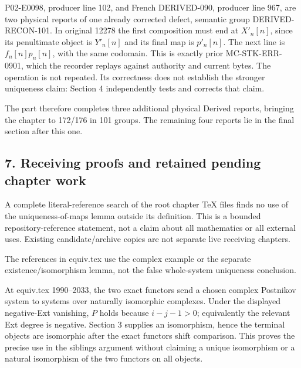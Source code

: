 \documentclass[11pt]{article}
\begin{document}
P02-E0098,\allowbreak{} producer line 102,\allowbreak{} and French DERIVED-090,\allowbreak{} producer line 967,\allowbreak{} are two physical reports of one already corrected defect,\allowbreak{} semantic group DERIVED-RECON-101. In original 12278 the first composition must end at \(X'_n[n]\),\allowbreak{} since its penultimate object is \(Y'_n[n]\) and its final map is \(p'_n[n]\). The next line is \(f_n[n]p_n[n]\),\allowbreak{} with the same codomain. This is exactly prior MC-STK-ERR-0901,\allowbreak{} which the recorder replays against authority and current bytes. The operation is not repeated. Its correctness does not establish the stronger uniqueness claim:\allowbreak{} Section 4 independently tests and corrects that claim.

The part therefore completes three additional physical Derived reports,\allowbreak{} bringing the chapter to 172/\allowbreak{}176 in 101 groups. The remaining four reports lie in the final section after this one.

\subsection{7. Receiving proofs and retained pending chapter work}\label{proofs-12008-12370-receiving-proofs-and-retained-pending-chapter-work}

A complete literal-reference search of the root chapter TeX files finds no use of the uniqueness-of-maps lemma outside its definition. This is a bounded repository-reference statement,\allowbreak{} not a claim about all mathematics or all external uses. Existing candidate/\allowbreak{}archive copies are not separate live receiving chapters.

The references in equiv.tex use the complex example or the separate existence/\allowbreak{}isomorphism lemma,\allowbreak{} not the false whole-system uniqueness conclusion.

At equiv.tex 1990–\allowbreak{}2033,\allowbreak{} the two exact functors send a chosen complex Postnikov system to systems over naturally isomorphic complexes. Under the displayed negative-Ext vanishing,\allowbreak{} \(P\) holds because \(i-j-1>0\); equivalently the relevant Ext degree is negative. Section 3 supplies an isomorphism,\allowbreak{} hence the terminal objects are isomorphic after the exact functors\textquotesingle{} shift comparison. This proves the precise use in the siblings argument without claiming a unique isomorphism or a natural isomorphism of the two functors on all objects.
\end{document}
